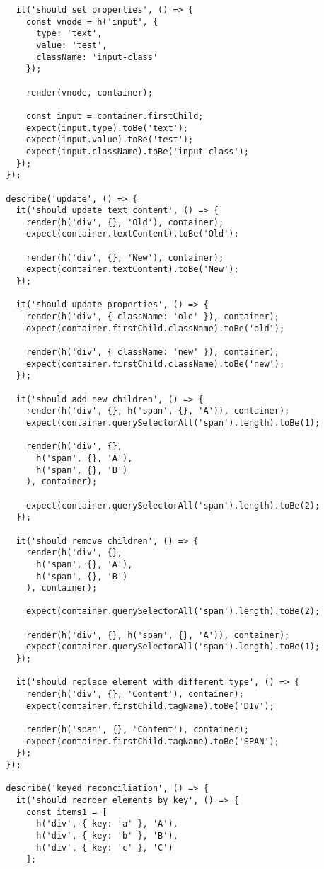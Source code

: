 \documentclass[11pt]{article}
\begin{document}
\begin{verbatim}
    it('should set properties', () => {
      const vnode = h('input', { 
        type: 'text', 
        value: 'test',
        className: 'input-class'
      });
      
      render(vnode, container);
      
      const input = container.firstChild;
      expect(input.type).toBe('text');
      expect(input.value).toBe('test');
      expect(input.className).toBe('input-class');
    });
  });
  
  describe('update', () => {
    it('should update text content', () => {
      render(h('div', {}, 'Old'), container);
      expect(container.textContent).toBe('Old');
      
      render(h('div', {}, 'New'), container);
      expect(container.textContent).toBe('New');
    });
    
    it('should update properties', () => {
      render(h('div', { className: 'old' }), container);
      expect(container.firstChild.className).toBe('old');
      
      render(h('div', { className: 'new' }), container);
      expect(container.firstChild.className).toBe('new');
    });
    
    it('should add new children', () => {
      render(h('div', {}, h('span', {}, 'A')), container);
      expect(container.querySelectorAll('span').length).toBe(1);
      
      render(h('div', {},
        h('span', {}, 'A'),
        h('span', {}, 'B')
      ), container);
      
      expect(container.querySelectorAll('span').length).toBe(2);
    });
    
    it('should remove children', () => {
      render(h('div', {},
        h('span', {}, 'A'),
        h('span', {}, 'B')
      ), container);
      
      expect(container.querySelectorAll('span').length).toBe(2);
      
      render(h('div', {}, h('span', {}, 'A')), container);
      expect(container.querySelectorAll('span').length).toBe(1);
    });
    
    it('should replace element with different type', () => {
      render(h('div', {}, 'Content'), container);
      expect(container.firstChild.tagName).toBe('DIV');
      
      render(h('span', {}, 'Content'), container);
      expect(container.firstChild.tagName).toBe('SPAN');
    });
  });
  
  describe('keyed reconciliation', () => {
    it('should reorder elements by key', () => {
      const items1 = [
        h('div', { key: 'a' }, 'A'),
        h('div', { key: 'b' }, 'B'),
        h('div', { key: 'c' }, 'C')
      ];
      

\end{verbatim}
\end{document}
